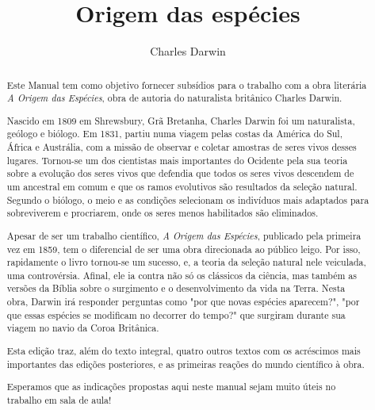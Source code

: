 \documentclass[12pt]{extarticle}
\begin{document}
\newcommand{\AutorLivro}{Charles Darwin}
\newcommand{\TituloLivro}{Origem das espécies}
\newcommand{\Tema}{História da ciência}
\newcommand{\Genero}{Tratado científico}
\newcommand{\imagemCapa}{./images/PNLD0060-01.png}
\newcommand{\issnppub}{---}
\newcommand{\issnepub}{---}
\newcommand{\colaborador}{\textbf{Fulano de Tal} é uma pessoa incrível e vai fazer um bom serviço.}


\title{\TituloLivro}
\author{\AutorLivro}
\def\authornotes{\colaborador}

\date{}
\maketitle






\begin{abstract}
Este Manual tem como objetivo fornecer subsídios para o trabalho com a
obra literária \emph{A Origem das Espécies}, obra de autoria do
naturalista britânico Charles Darwin.

Nascido em 1809 em Shrewsbury, Grã Bretanha, Charles Darwin foi um naturalista,
geólogo e biólogo. Em 1831, partiu numa viagem pelas costas da América do Sul,
África e Austrália, com a missão de observar e coletar amostras de seres vivos
desses lugares. Tornou-se um dos cientistas mais importantes do Ocidente pela 
sua teoria sobre a evolução dos seres vivos que defendia que todos os seres vivos 
descendem de um ancestral em comum e que os ramos evolutivos são resultados da 
seleção natural. Segundo o biólogo, o meio e as condições selecionam os indivíduos 
mais adaptados para sobreviverem e procriarem, onde os seres menos habilitados são eliminados.

Apesar de ser um trabalho científico, \emph{A Origem das Espécies}, publicado pela 
primeira vez em 1859, tem o diferencial de ser uma obra direcionada ao público leigo. 
Por isso, rapidamente o livro tornou-se um sucesso, e, a teoria da seleção natural 
nele veiculada, uma controvérsia. Afinal, ele ia contra não só os clássicos da ciência, 
mas também as versões da Bíblia sobre o surgimento e o desenvolvimento da vida na Terra.
Nesta obra, Darwin irá responder perguntas como "por que novas espécies aparecem?", 
"por que essas espécies se modificam no decorrer do tempo?" que surgiram durante sua viagem
no navio da Coroa Britânica. 

Esta edição traz, além do texto integral, quatro outros textos com os acréscimos mais 
importantes das edições posteriores, e as primeiras reações do mundo científico à obra. 

Esperamos que as indicações propostas aqui neste manual sejam muito úteis no trabalho em
sala de aula!

\end{abstract}
\end{document}
